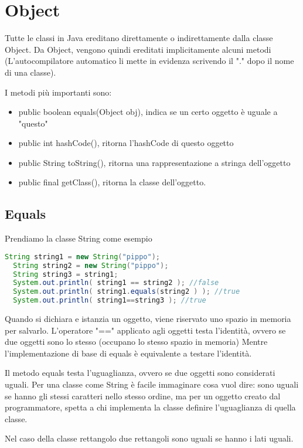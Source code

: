 \documentclass[a4paper,12pt,twoside]{book}
\begin{document}
\section{Object}

Tutte le classi in Java ereditano direttamente o indirettamente dalla
classe Object. Da Object, vengono quindi ereditati implicitamente
alcuni metodi (L'autocompilatore automatico li mette in evidenza
scrivendo il "." dopo il nome di una classe).

I metodi più importanti sono:
\begin{itemize}
\item public boolean equals(Object obj), indica se un certo oggetto è
  uguale a "questo"
\item public int hashCode(), ritorna l'hashCode di questo oggetto
\item public String toString(), ritorna una rappresentazione a stringa
  dell'oggetto
\item public final getClass(), ritorna la classe dell'oggetto.
\end{itemize}

\subsection{Equals} 
Prendiamo la classe String come esempio
\begin{lstlisting}[caption={Identità vs Uguaglianza},
  label={lst:Equals},language=Java]
  String string1 = new String("pippo");
  String string2 = new String("pippo");
  String string3 = string1;
  System.out.println( string1 == string2 ); //false
  System.out.println( string1.equals(string2 ) ); //true
  System.out.println( string1==string3 ); //true

\end{lstlisting}
Quando si dichiara e istanzia un oggetto, viene riservato uno spazio
in memoria per salvarlo. L’operatore "==" applicato agli oggetti testa
l’identità, ovvero se due oggetti sono lo stesso (occupano lo stesso
spazio in memoria) Mentre l'implementazione di base di equals è
equivalente a testare l’identità.

Il metodo equals testa l’uguaglianza, ovvero se due oggetti sono
considerati uguali. Per una classe come String è facile immaginare
cosa vuol dire: sono uguali se hanno gli stessi caratteri nello stesso
ordine, ma per un oggetto creato dal programmatore, spetta a chi
implementa la classe definire l'uguaglianza di quella classe.

Nel caso della classe rettangolo due rettangoli sono uguali se hanno i
lati uguali.
\end{document}
